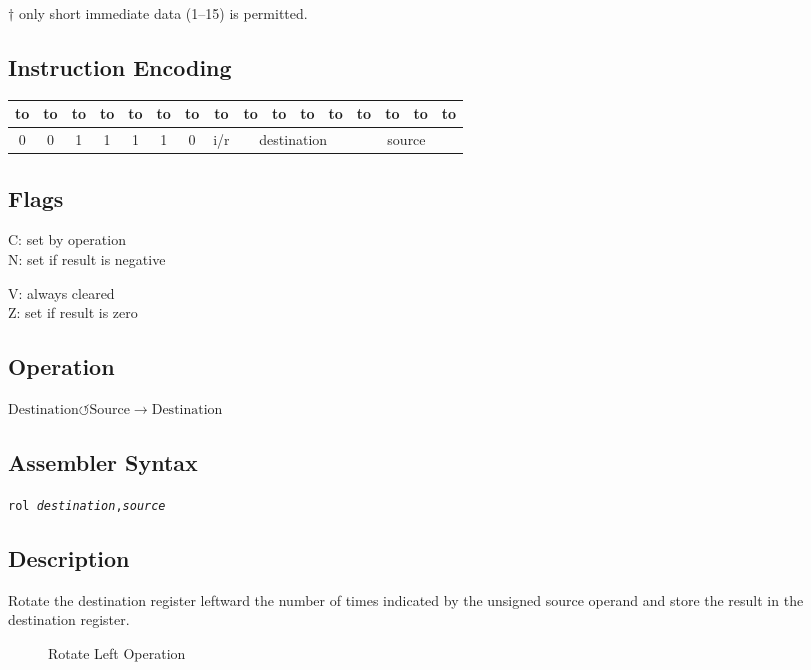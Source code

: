 \documentclass[12pt,english]{book}
\newcommand*{\encoding}[1]{\noindent
\begin{tabular}{|c|c|c|c|c|c|c|c|c|c|c|c|c|c|c|c|}
\multicolumn{1}{c}{\hbox to \wd\boxa{\hss 15\hss}}&
\multicolumn{1}{c}{\hbox to \wd\boxa{\hss 14\hss}}&
\multicolumn{1}{c}{\hbox to \wd\boxa{\hss 13\hss}}&
\multicolumn{1}{c}{\hbox to \wd\boxa{\hss 12\hss}}&
\multicolumn{1}{c}{\hbox to \wd\boxa{\hss 11\hss}}&
\multicolumn{1}{c}{\hbox to \wd\boxa{\hss 10\hss}}&
\multicolumn{1}{c}{\hbox to \wd\boxa{\hss 9\hss}}&
\multicolumn{1}{c}{\hbox to \wd\boxa{\hss 8\hss}}&
\multicolumn{1}{c}{\hbox to \wd\boxa{\hss 7\hss}}&
\multicolumn{1}{c}{\hbox to \wd\boxa{\hss 6\hss}}&
\multicolumn{1}{c}{\hbox to \wd\boxa{\hss 5\hss}}&
\multicolumn{1}{c}{\hbox to \wd\boxa{\hss 4\hss}}&
\multicolumn{1}{c}{\hbox to \wd\boxa{\hss 3\hss}}&
\multicolumn{1}{c}{\hbox to \wd\boxa{\hss 2\hss}}&
\multicolumn{1}{c}{\hbox to \wd\boxa{\hss 1\hss}}&
\multicolumn{1}{c}{\hbox to \wd\boxa{\hss 0\hss}}\\\hline
#1\\\hline
\end{tabular}}
\newcommand*{\instruction}[2][]{%
  \clearpage
  \thispagestyle{fancy}%
  \fancyhf[HL,HR]{\huge{#2}}%
  \fancyhf[HC]{#1}\addtocounter{section}{1}\noindent
}
\begin{document}
\noindent
\(\dagger\) only short immediate data (1--15) is permitted.

\subsection*{Instruction Encoding}
\encoding{0&0&1&1%
&1&1&0%
&{i/r}
&\multicolumn{4}{|c|}{destination}
&\multicolumn{4}{|c|}{source}}

\subsection*{Flags}
\begin{multicols}{2}\noindent
  C: set by operation\\
  N: set if result is negative

  \columnbreak\noindent
  V: always cleared\\
  Z: set if result is zero
\end{multicols}


\instruction[Rotate Left]{ROL}
\subsection*{Operation}
\(\text{Destination}\circlearrowleft\text{Source}
\rightarrow\text{Destination}\)

\subsection*{Assembler Syntax}
\texttt{rol \textit{destination},\textit{source}}

\subsection*{Description}
Rotate the destination register
leftward the number of times indicated by the unsigned source operand
and store the result in the destination register.

\begin{figure}[htb]\centering
  \caption{Rotate Left Operation}
  \label{fig:rol}
\end{figure}
\end{document}
